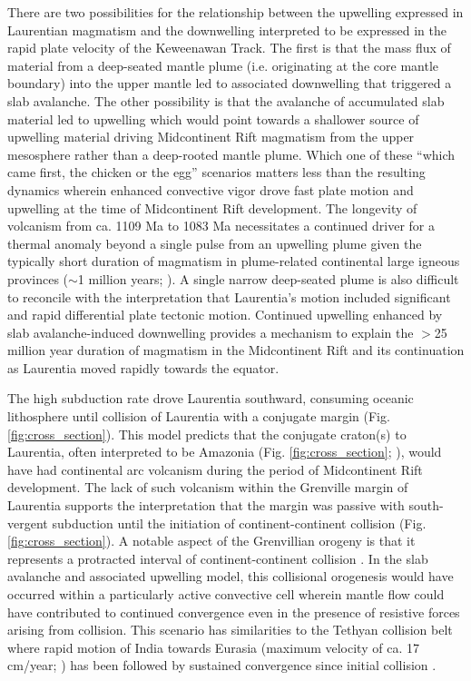 \documentclass[11pt,letterpaper]{article}
\begin{document}
There are two possibilities for the relationship between the upwelling expressed in Laurentian magmatism and the downwelling interpreted to be expressed in the rapid plate velocity of the Keweenawan Track. The first is that the mass flux of material from a deep-seated mantle plume (i.e. originating at the core mantle boundary) into the upper mantle led to associated downwelling that triggered a slab avalanche. The other possibility is that the avalanche of accumulated slab material led to upwelling which would point towards a shallower source of upwelling material driving Midcontinent Rift magmatism from the upper mesosphere rather than a deep-rooted mantle plume. Which one of these ``which came first, the chicken or the egg'' scenarios matters less than the resulting dynamics wherein enhanced convective vigor drove fast plate motion and upwelling at the time of Midcontinent Rift development. The longevity of  volcanism from ca. 1109 Ma to 1083 Ma necessitates a continued driver for a thermal anomaly beyond a single pulse from an upwelling plume given the typically short duration of magmatism in plume-related continental large igneous provinces ($\sim$1 million years; \citealp{Blackburn2013a, Burgess2015a,Schoene2014b,Renne2015a}). A single narrow deep-seated plume is also difficult to reconcile with the interpretation that Laurentia's motion included significant and rapid differential plate tectonic motion. Continued upwelling enhanced by slab avalanche-induced downwelling provides a mechanism to explain the $>$25 million year duration of magmatism in the Midcontinent Rift and its continuation as Laurentia moved rapidly towards the equator.

The high subduction rate drove Laurentia southward, consuming oceanic lithosphere until collision of Laurentia with a conjugate margin (Fig. \ref{fig:cross_section}). This model predicts that the conjugate craton(s) to Laurentia, often interpreted to be Amazonia (Fig. \ref{fig:cross_section}; \citealp{Evans2013b}), would have had continental arc volcanism during the period of Midcontinent Rift development. The lack of such volcanism within the Grenville margin of Laurentia supports the interpretation that the margin was passive with south-vergent subduction until the initiation of continent-continent collision (Fig. \ref{fig:cross_section}).  A notable aspect of the Grenvillian orogeny is that it represents a protracted interval of continent-continent collision \citep{Rivers2008a, Hynes2010a}. In the slab avalanche and associated upwelling model, this collisional orogenesis would have occurred within a particularly active convective cell wherein mantle flow could have contributed to continued convergence even in the presence of resistive forces arising from collision. This scenario has similarities to the Tethyan collision belt where rapid motion of India towards Eurasia (maximum velocity of ca. 17 cm/year; \citealp{Hinsbergen2011a}) has been followed by sustained convergence since initial collision \citep{Alvarez2010a, Becker2011a}.
\end{document}
